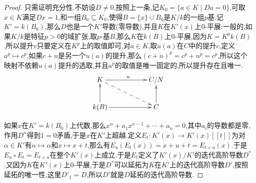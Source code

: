 \begin{enumerate}
\begin{proof}
    	只需证明充分性.不妨设$D\not=0$,按照上一条,记$K_0=\{a\in K\mid Da=0\}$,可取$x\in K$满足$Dx=1$,和一组$B_0\subseteq K_0$,使得$B=\{x\}\cup B_0$是$K/k$的一组$p$基.记$K'=k(B_0)$,那么$D$也是一个$K'$导数(零导数),并且$K$在$K'(x)$上0-平展:一般的,如果$K/k$是特征$p>0$的域扩张,取$p$-基$B$,那么$K$在$k(B)$上0-平展,因为$K=K^pk(B)$,所以提升$v$只要定义在$K^p$上的取值即可,对$a\in K$,取$u(a)$在$C$中的提升$c$,定义$a^p\mapsto c^p$,如果$c+n$是另一个$u(a)$的提升,那么$(c+n)^p=c^p+n^p=c^p$,所以这个映射不依赖$u(a)$提升的选取,并且$a^p$的取值是唯一固定的,所以提升存在且唯一.
    	$$\xymatrix{K\ar[rr]^u\ar@{-->}[drr]&&C/N\\k(B)\ar[u]\ar[rr]&&C\ar[u]}$$
    	
    	如果$x$在$K'=k(B_0)$上代数,那么$x^n+a_1x^{n-1}+\cdots+a_n=0$,其中$a_i$的导数都是零,作用$D^n$得到$1=0$矛盾,于是$x$在$K'$上超越.定义$E_t:K'(x)\to K'(x)[[t]]$为对$\alpha\in K'$有$\alpha\mapsto\alpha$和$x\mapsto x+t$,那么有$E_u(E_t(x))=x+u+t=E_{t+u}(x)$.于是$E_u\circ E_t=E_{t+u}$在整个$K'(x)$上成立.于是$E_t$定义了$K'(x)/K'$的迭代高阶导数$D^*$.又因为$K$在$K'(x)$上0-平展,于是$D^*$可以延拓为$K$在$K'$上的迭代高阶导数$D'$,按照延拓的唯一性,这里$D'_1=D$,所以$D'$就是$D$延拓的迭代高阶导数.
    \end{proof}
\end{enumerate}










